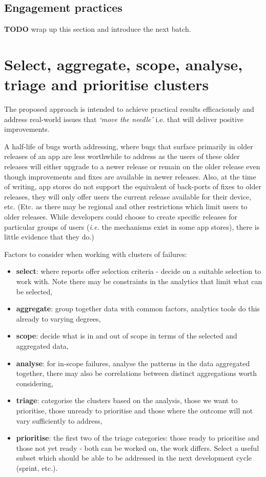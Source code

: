 \subsection{Engagement practices}

\textbf{TODO} wrap up this section and introduce the next batch.



\section{Select, aggregate, scope, analyse, triage and prioritise clusters}
The proposed approach is intended to achieve practical results efficaciously and address real-world issues that \emph{`move the needle'} i.e. that will deliver positive improvements. 

A half-life of bugs worth addressing, where bugs that surface primarily in older releases of an app are less worthwhile to address as the users of these older releases will either upgrade to a newer release or remain on the older release even though improvements and fixes are available in newer releases. Also, at the time of writing, app stores do not support the equivalent of back-ports of fixes to older releases, they will only offer users the current release available for their device, etc. (Etc. as there may be regional and other restrictions which limit users to older releases. While developers could choose to create specific releases for particular groups of users (\emph{i.e.} the mechanisms exist in some app stores), there is little evidence that they do.)

Factors to consider when working with clusters of failures: 

\begin{itemize}
    \item \textbf{select}: where reports offer selection criteria - decide on a suitable selection to work with. Note there may be constraints in the analytics that limit what can be selected,
    \item \textbf{aggregate}: group together data with common factors, analytics tools do this already to varying degrees,
    \item \textbf{scope}: decide what is in and out of scope in terms of the selected and aggregated data, 
    \item \textbf{analyse}: for in-scope failures, analyse the patterns in the data aggregated together, there may also be correlations between distinct aggregations worth considering, 
    \item \textbf{triage}: categorise the clusters based on the analysis, those we want to prioritise, those unready to prioritise and those where the outcome will not vary sufficiently to address,
    \item \textbf{prioritise}: the first two of the triage categories: those ready to prioritise and those not yet ready - both can be worked on, the work differs. Select a useful subset which should be able to be addressed in the next development cycle (sprint, etc.).
\end{itemize}

